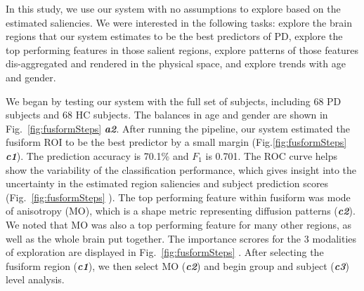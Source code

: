 \noindent In this study, we use our system with no assumptions to explore based on the estimated saliencies. We were interested in the following tasks: explore the brain regions that our system estimates to be the best predictors of PD, %
explore the top performing features in those salient regions, explore patterns of those features dis-aggregated and rendered in the physical space, and explore trends with age and gender.  



We began by testing our system with the full set of subjects, including 68 PD subjects and 68 HC subjects. The balances in age and gender are shown in Fig.~\ref{fig:fusformSteps} \textbf{\textit{a2}}. After running the pipeline, our system estimated the fusiform ROI to be the best predictor by a small margin (Fig.\ref{fig:fusformSteps} \textbf{\textit{c1}}). The prediction accuracy is 70.1\% and $F_1$ is 0.701. The ROC curve helps show the variability of the classification performance, which gives insight into the uncertainty in the estimated region saliencies and subject prediction scores (Fig.~\ref{fig:fusformSteps} ). The top performing feature within fusiform was mode of anisotropy (MO), which is a shape metric representing diffusion patterns (\textbf{\textit{c2}}). We noted that MO was also a top performing feature for many other regions, as well as the whole brain put together. The importance scrores for the 3 modalities of exploration are displayed in Fig.~\ref{fig:fusformSteps} . After selecting the fusiform region (\textbf{\textit{c1}}), we then select MO (\textbf{\textit{c2}}) and begin group and subject (\textbf{\textit{c3}}) level analysis. 

